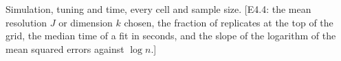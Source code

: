\begin{table}[t]
\color{colR1}
\caption{Simulation, tuning and time, every cell and sample size. [E4.4: the mean resolution $J$ or dimension $k$ chosen, the fraction of replicates at the top of the grid, the median time of a fit in seconds, and the slope of the logarithm of the mean squared errors against $\log n$.]}
\label{tab:sim-tuning}
\centering
{}
\end{table}
